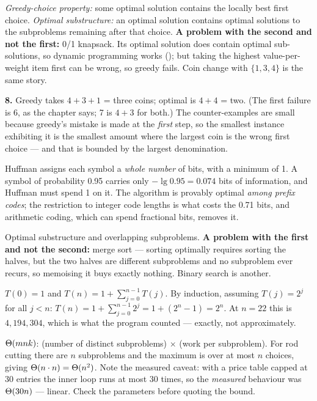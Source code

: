 \begin{ans}
  \item \emph{Greedy-choice property:} some optimal solution contains the
        locally best first choice. \emph{Optimal substructure:} an optimal
        solution contains optimal solutions to the subproblems remaining after
        that choice. \textbf{A problem with the second and not the first:} 0/1
        knapsack. Its optimal solution does contain optimal sub-solutions, so
        dynamic programming works (); but taking the highest
        value-per-weight item first can be wrong, so greedy fails. Coin change
        with $\{1,3,4\}$ is the same story.
  \item \textbf{8.} Greedy takes $4+3+1$ = three coins; optimal is $4+4$ = two.
        (The first failure is 6, as the chapter says; 7 is $4+3$ for both.)
        The counter-examples are small because greedy's mistake is made at the
        \emph{first} step, so the smallest instance exhibiting it is the
        smallest amount where the largest coin is the wrong first choice ---
        and that is bounded by the largest denomination.
  \item Huffman assigns each symbol a \emph{whole number} of bits, with a
        minimum of 1. A symbol of probability 0.95 carries only
        $-\lg 0.95 = 0.074$ bits of information, and Huffman must spend 1 on
        it. The algorithm is provably optimal \emph{among prefix codes}; the
        restriction to integer code lengths is what costs the 0.71 bits, and
        arithmetic coding, which can spend fractional bits, removes it.
\end{ans}

\begin{ans}
  \item Optimal substructure and overlapping subproblems. \textbf{A problem
        with the first and not the second:} merge sort --- sorting optimally
        requires sorting the halves, but the two halves are different
        subproblems and no subproblem ever recurs, so memoising it buys exactly
        nothing. Binary search is another.
  \item $T(0) = 1$ and $T(n) = 1 + \sum_{j=0}^{n-1} T(j)$. By induction,
        assuming $T(j) = 2^{j}$ for all $j < n$:
        $T(n) = 1 + \sum_{j=0}^{n-1}2^{j} = 1 + (2^{n}-1) = 2^{n}$. At
        $n = 22$ this is $4{,}194{,}304$, which is what the program counted ---
        exactly, not approximately.
  \item $\Theta(mnk)$: (number of distinct subproblems) $\times$ (work per
        subproblem). For rod cutting there are $n$ subproblems and the maximum
        is over at most $n$ choices, giving $\Theta(n \cdot n) =
        \Theta(n^{2})$. Note the measured caveat: with a price table capped at
        30 entries the inner loop runs at most 30 times, so the \emph{measured}
        behaviour was $\Theta(30n)$ --- linear. Check the parameters before
        quoting the bound.
\end{ans}


